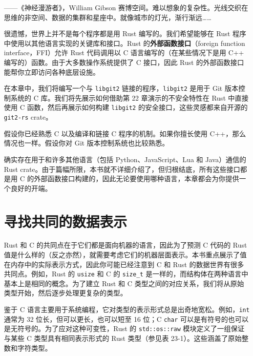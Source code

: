 
\begin{myEpigraph}{——《神经漫游者》，William Gibson}
赛博空间。难以想象的复杂性。光线交织在思维的非空间、数据的集群和星座中。就像城市的灯光，渐行渐远……
\end{myEpigraph}

很遗憾，世界上并不是每个程序都是用 Rust 编写的。我们希望能够在 Rust 程序中使用以其他语言实现的关键库和接口。Rust 的\textbf{外部函数接口}（foreign function interface，FFI）允许 Rust 代码调用以 C 语言编写的（在某些情况下是用 C++ 编写的）函数。由于大多数操作系统提供了 C 接口，因此 Rust 的外部函数接口能帮你立即访问各种底层设施。

在本章中，我们将编写一个与 \texttt{libgit2} 链接的程序，\texttt{libgit2} 是用于 Git 版本控制系统的 C 库。我们将先展示如何借助第 22 章演示的不安全特性在 Rust 中直接使用 C 函数，然后再展示如何构建 \texttt{libgit2} 的安全接口，这些灵感都来自开源的 \texttt{git2-rs} crate。

假设你已经熟悉 C 以及编译和链接 C 程序的机制。如果你擅长使用 C++，那么情况也一样。假设你对 Git 版本控制系统也比较熟悉。

确实存在用于和许多其他语言（包括 Python、JavaScript、Lua 和 Java）通信的 Rust crate。由于篇幅所限，本书就不详细介绍了，但归根结底，所有这些接口都是用 C 的外部函数接口构建的，因此无论要使用哪种语言，本章都会为你提供一个良好的开端。

\section{寻找共同的数据表示}

Rust 和 C 的共同点在于它们都是面向机器的语言，因此为了预测 C 代码的 Rust 值是什么样的（反之亦然），就需要考虑它们的机器层面表示。本书重点展示了值在内存中的实际表示方式，因此你可能已经注意到 C 和 Rust 的数据世界有很多共同点。例如，Rust 的 \texttt{usize} 和 C 的 \texttt{size\_t} 是一样的，而结构体在两种语言中基本上是相同的概念。为了建立 Rust 和 C 类型之间的对应关系，我们将从原始类型开始，然后逐步处理更复杂的类型。

鉴于 C 语言主要用于系统编程，它对类型的表示形式总是出奇地宽松。例如，\texttt{int} 通常为 32 位长，但可以更长，也可以短至 16 位；C \texttt{char} 可以是有符号的也可以是无符号的。为了应对这种可变性，Rust 的 \texttt{std::os::raw} 模块定义了一组保证与某些 C 类型具有相同表示形式的 Rust 类型（参见表 23-1）。这些涵盖了原始整数和字符类型。

